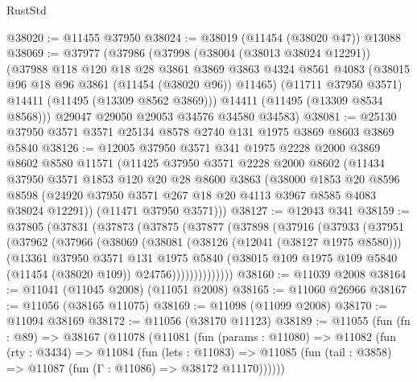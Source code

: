 \begin{lexlean}{RustStd}
\begin{coremodule}
@38020 := @11455 @37950
@38024 := @38019 (@11454 (@38020 @47)) @13088
@38069 := @37977
    (@37986
      (@37998
        (@38004 (@38013 @38024 @12291))
        (@37988
          @118
          @120
          @18
          @28
          @3861
          @3869
          @3863
          @4324
          @8561
          @4083
          (@38015 @96 @18 @96 @3861 (@11454 (@38020 @96)) @11465)
          (@11711 @37950 @3571)
          @14411
          (@11495 (@13309 @8562 @3869)))
        @14411
        (@11495 (@13309 @8534 @8568)))
      @29047
      @29050
      @29053
      @34576
      @34580
      @34583)
@38081 := @25130 @37950 @3571 @3571 @25134 @8578 @2740 @131 @1975 @3869 @8603 @3869 @5840
@38126 := @12005
    @37950
    @3571
    @341
    @1975
    @2228
    @2000
    @3869
    @8602
    @8580
    @11571
    (@11425
      @37950
      @3571
      @2228
      @2000
      @8602
      (@11434
        @37950
        @3571
        @1853
        @120
        @20
        @28
        @8600
        @3863
        (@38000
          @1853
          @20
          @8596
          @8598
          (@24920 @37950 @3571 @267 @18 @20 @4113 @3967 @8585 @4083 @38024 @12291))
        (@11471 @37950 @3571)))
@38127 := @12043 @341
@38159 := @37805
    (@37831
      (@37873
        (@37875
          (@37877
            (@37898
              (@37916
                (@37933
                  (@37951
                    (@37962
                      (@37966
                        (@38069
                          (@38081
                            (@38126 (@12041 (@38127 @1975 @8580)))
                            (@13361
                              @37950
                              @3571
                              @131
                              @1975
                              @5840
                              (@38015
                                @109
                                @1975
                                @109
                                @5840
                                (@11454 (@38020 @109))
                                @24756))))))))))))))
@38160 := @11039 @2008
@38164 := @11041 (@11045 @2008) (@11051 @2008)
@38165 := @11060 @26966
@38167 := @11056 (@38165 @11075)
@38169 := @11098 (@11099 @2008)
@38170 := @11094 @38169
@38172 := @11056 (@38170 @11123)
@38189 := @11055
    (fun (fn : @89) =>
    @38167
      (@11078
        (@11081
          (fun (params : @11080) =>
          @11082
            (fun (rty : @3434) =>
            @11084
              (fun (lets : @11083) =>
              @11085 (fun (tail : @3858) => @11087 (fun (Γ : @11086) => @38172 @11170))))))

\end{coremodule}
\end{lexlean}
